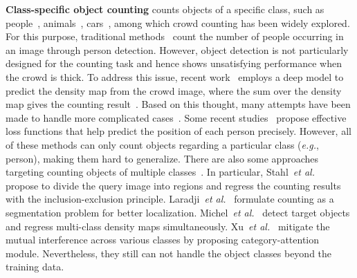 \documentclass[10pt,twocolumn,letterpaper]{article}
\begin{document}
\vspace{2pt}\noindent\textbf{Class-specific object counting}
counts objects of a specific class, such as people~\cite{liu2021cross, song2021rethinking, zhang2021cross, mcnn}, animals~\cite{penguin}, cars~\cite{lpn}, among which crowd counting has been widely explored.
For this purpose, traditional methods~\cite{leibe2005pedestrian, stewart2016end, wang2011automatic} count the number of people occurring in an image through person detection.
However, object detection is not particularly designed for the counting task and hence shows unsatisfying performance when the crowd is thick.
To address this issue, recent work~\cite{wan2019residual} employs a deep model to predict the density map from the crowd image, where the sum over the density map gives the counting result~\cite{lempitsky2010learning}.
Based on this thought, many attempts have been made to handle more complicated cases~\cite{yan2019perspective, rpnet, switch_cnn, mcnn, ranjan2018iterative, sam2018top, shi2018crowd, sindagi2017generating, xiong2017spatiotemporal, crowd_cnn, liu2018decidenet}.
Some recent studies~\cite{song2021rethinking, glf} propose effective loss functions that help predict the position of each person precisely.
However, all of these methods can only count objects regarding a particular class (\textit{e.g.}, person), making them hard to generalize.
There are also some approaches targeting counting objects of multiple classes~\cite{iep_counting, blobs, michel2022class, xu2021dilated}.
In particular, Stahl~\textit{et al.}~\cite{iep_counting} propose to divide the query image into regions and regress the counting results with the inclusion-exclusion principle.
Laradji~\textit{et al.}~\cite{blobs} formulate counting as a segmentation problem for better localization.
Michel~\textit{et al.}~\cite{michel2022class} detect target objects and regress multi-class density maps simultaneously.
Xu~\textit{et al.}~\cite{xu2021dilated} mitigate the mutual interference across various classes by proposing category-attention module.
Nevertheless, they still can not handle the object classes beyond the training data. 
\end{document}
